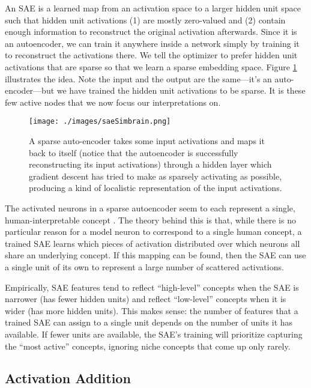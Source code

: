 An SAE is a learned map from an activation space to a larger hidden unit space
such that hidden unit activations (1) are mostly zero-valued and (2) contain
enough information to reconstruct the original activation afterwards. Since it
is an autoencoder, we can train it anywhere inside a network simply by training
it to reconstruct the activations there. We tell the optimizer to prefer hidden
unit activations that are sparse so that we learn a sparse embedding space.
Figure \ref{saeSimbrain} illustrates the idea. Note the input and the output
are the same---it's an auto-encoder---but we have trained the hidden unit
activations to be sparse. It is these few active nodes that we now focus our
interpretations on.

\begin{figure}[ht]
\centering
\texttt{[image: ./images/saeSimbrain.png]}
\caption[Simbrain screenshot from Jeff Yoshimi.]{ A sparse auto-encoder takes
      some input activations and maps it back to itself (notice that the
      autoencoder is successfully reconstructing its input activations) through
      a hidden layer which gradient descent has tried to make as sparsely
      activating as possible, producing a kind of localistic representation of
      the input activations. }
\label{saeSimbrain}
\end{figure}

The activated neurons in a sparse autoencoder seem to each represent a single,
human-interpretable concept \cite{cunningham2023sparse,
bricken2023monosemanticity}. The theory behind this is that, while there is no
particular reason for a model neuron to correspond to a single human concept, a
trained SAE learns which pieces of activation distributed over which neurons
all share an underlying concept. If this mapping can be found, then the SAE can
use a single unit of its own to represent a large number of scattered
activations.

Empirically, SAE features tend to reflect ``high-level'' concepts when the SAE
is narrower (has fewer hidden units) and reflect ``low-level'' concepts when it
is wider (has more hidden units). This makes sense: the number of features that
a trained SAE can assign to a single unit depends on the number of units it has
available. If fewer units are available, the SAE's training will prioritize
capturing the ``most active'' concepts, ignoring niche concepts that come up
only rarely.

\subsection{Activation Addition}

